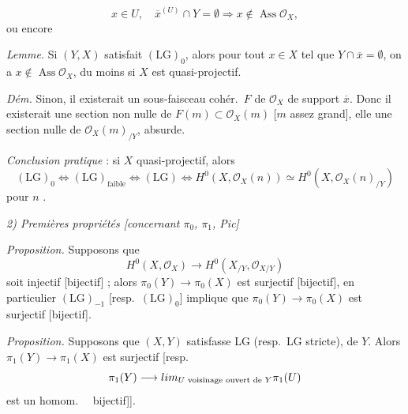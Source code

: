 \documentclass[11pt,a4paper]{article}
\begin{document}
\[
  x \in U, \quad \overline{x}^{(U)} \cap Y = \emptyset \Longrightarrow x \notin \operatorname{Ass} \mathcal{O}_X ,
\]
ou encore \ill{} \ill{}

\emph{Lemme.} Si $(Y, X)$ satisfait $(\mathrm{LG})_0$, alors pour tout $x \in X$ tel que $Y \cap \overline{x} = \emptyset$, on a $x \notin \operatorname{Ass} \mathcal{O}_X$, du moins si $X$ est quasi-projectif.

\emph{Dém.} Sinon, il existerait un sous-faisceau cohér.\ $F$ \struck{\ill{}} de $\mathcal{O}_X$ \ill{} de support $\overline{x}$. Donc il existerait une section non nulle de $F(m) \subset \mathcal{O}_X(m)$ [$m$ assez grand],  \ill{} elle  une section nulle de $\mathcal{O}_X(m)_{/Y}$, absurde.

\emph{Conclusion pratique} : si $X$ quasi-projectif, alors
\[
  (\mathrm{LG})_0 \Longleftrightarrow (\mathrm{LG})_{\text{faible}} \Longleftrightarrow (\mathrm{LG}) \Longleftrightarrow H^0(X, \mathcal{O}_X(n)) \simeq H^0(X, \mathcal{O}_X(n)_{/Y})
\]
pour $n$ .

\emph{2) Premières propriétés [concernant $\pi_0$, $\pi_1$, Pic]}

\emph{Proposition.} Supposons que
\[
  H^0(X, \mathcal{O}_X) \longrightarrow H^0(X_{/Y}, \mathcal{O}_{X/Y})
\]
soit injectif [bijectif] ; alors $\pi_0(Y) \to \pi_0(X)$ est surjectif [bijectif], en particulier $(\mathrm{LG})_{-1}$ [resp.\ $(\mathrm{LG})_0$] implique que $\pi_0(Y) \to \pi_0(X)$ est surjectif [bijectif].

\emph{Proposition.} Supposons que $(X, Y)$ satisfasse \struck{\ill{}} LG (resp.\ LG stricte), \ill{} \ill{} \ill{} \ill{} \ill{} de $Y$. Alors $\pi_1(Y) \to \pi_1(X)$ est surjectif [resp.
\[
  \pi_1(Y) \longrightarrow \varprojlim_{U \text{ voisinage ouvert de } Y} \pi_1(U)
\]
est un homom.\  \struck{[resp.}\ bijectif]].
\end{document}

